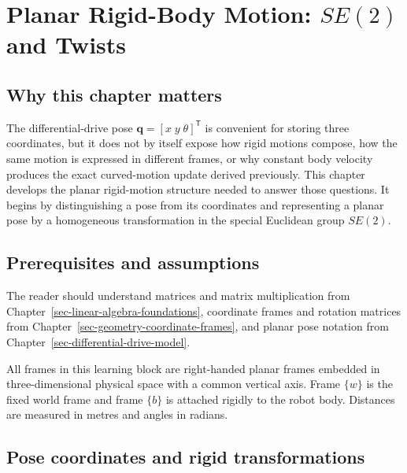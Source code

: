 \documentclass[
  australian,
  12pt,
  letterpaper,
  DIV=11,
  numbers=noendperiod,
  twoside]{scrreprt}
\begin{document}
\chapter{\texorpdfstring{Planar Rigid-Body Motion: \(SE(2)\) and
Twists}{Planar Rigid-Body Motion: SE(2) and Twists}}\label{sec-planar-rigid-body-motion}

\section*{Why this chapter matters}\label{why-this-chapter-matters-1}


The differential-drive pose \(\mathbf q=[x\;y\;\theta]^\mathsf T\) is
convenient for storing three coordinates, but it does not by itself
expose how rigid motions compose, how the same motion is expressed in
different frames, or why constant body velocity produces the exact
curved-motion update derived previously. This chapter develops the
planar rigid-motion structure needed to answer those questions. It
begins by distinguishing a pose from its coordinates and representing a
planar pose by a homogeneous transformation in the special Euclidean
group \(SE(2)\).

\section*{Prerequisites and
assumptions}\label{prerequisites-and-assumptions-3}


The reader should understand matrices and matrix multiplication from
Chapter~\ref{sec-linear-algebra-foundations}, coordinate frames and
rotation matrices from Chapter~\ref{sec-geometry-coordinate-frames}, and
planar pose notation from Chapter~\ref{sec-differential-drive-model}.

All frames in this learning block are right-handed planar frames
embedded in three-dimensional physical space with a common vertical
axis. Frame \(\{w\}\) is the fixed world frame and frame \(\{b\}\) is
attached rigidly to the robot body. Distances are measured in metres and
angles in radians.

\section{Pose coordinates and rigid
transformations}\label{pose-coordinates-and-rigid-transformations}
\end{document}
